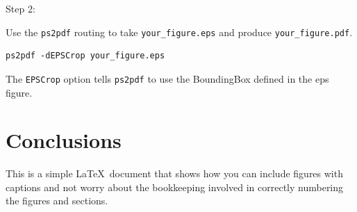 \documentclass[a4,modern]{aastex63}
\begin{document}
Step 2:

Use the \verb=ps2pdf= routing to take \verb=your_figure.eps= and produce
\verb=your_figure.pdf=.

\begin{verbatim}
ps2pdf -dEPSCrop your_figure.eps
\end{verbatim}

The \verb=EPSCrop= option tells \verb=ps2pdf= to use the BoundingBox defined in the eps figure.

\section{Conclusions}

This is a simple \LaTeX\ document that shows how you can include figures with captions and not worry about the bookkeeping involved in correctly numbering the figures and sections.



\end{document}
